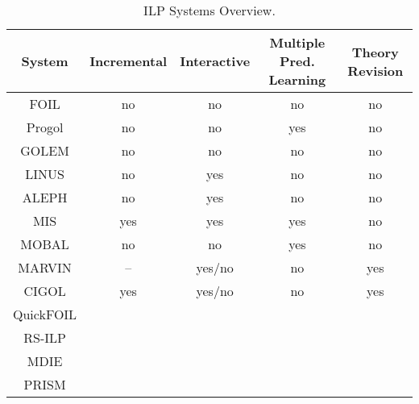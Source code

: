 \begin{table}[t]
\begin{tabular}{|c|c|c|c|c|}
\hline
System & Incremental & Interactive & Multiple Pred. Learning & Theory Revision \\
\hline
FOIL & no & no & no & no \\
Progol & no & no & yes & no \\
GOLEM & no & no & no & no \\
LINUS & no & yes & no & no \\
ALEPH & no & yes & no & no \\
MIS & yes & yes & yes & no \\
MOBAL & no & no & yes & no \\
MARVIN & -- & yes/no & no & yes \\
CIGOL & yes & yes/no & no & yes \\
QuickFOIL &  &  &  & \\ 
RS-ILP &  &  &  & \\
MDIE &  &  &  & \\
PRISM &  &  &  & \\
\hline
\end{tabular}
\caption{ILP Systems Overview.}
\label{tab:ilp}
\end{table}